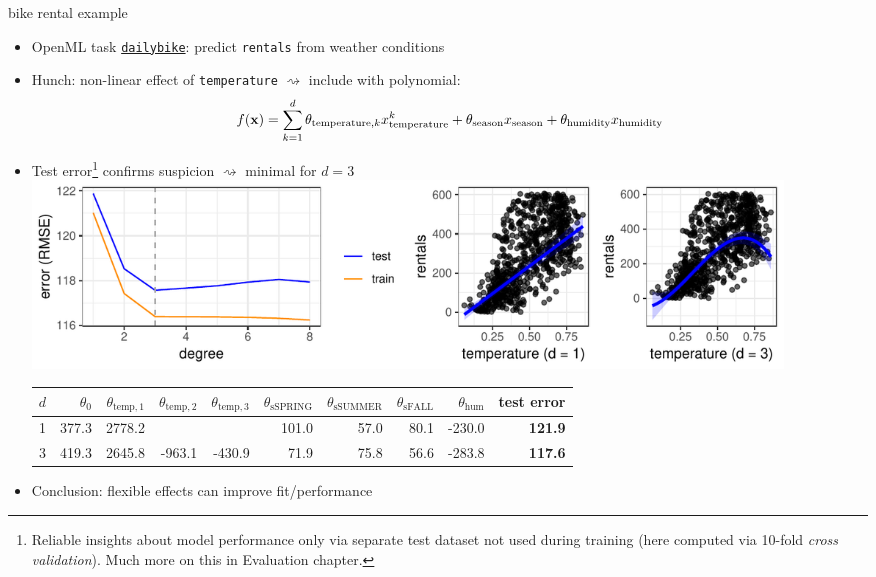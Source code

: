 \documentclass[11pt,compress,t,notes=noshow, xcolor=table]{beamer}
\begin{document}
\begin{frame}{bike rental example}

\begin{itemize}
    \footnotesize
    \item OpenML task \href{https://www.openml.org/search?type=data&sort=runs&id=45103&status=active}{
    \texttt{dailybike}}: predict \texttt{rentals} from weather conditions
    \item Hunch: non-linear effect of \texttt{temperature} $\rightsquigarrow$
    include with polynomial:
    \[
        f(\mathbf{x}) = \sum_{k=1}^d \theta_{\text{temperature}, k}
        x_{\text{temperature}}^k + \theta_{\text{season}} x_{\text{season}} +
        \theta_{\text{humidity}} x_{\text{humidity}}
    \]
    \item Test error\footnote[frame]{
    \scriptsize
    Reliable insights about model performance only via separate test
    dataset not used during training (here computed via 10-fold
    \textit{cross validation}). Much more on this in Evaluation chapter.
    } confirms suspicion $\rightsquigarrow$ minimal
    for $d = 3$
    \vfill
    \includegraphics[width=0.9\textwidth]{figure/reg_poly_bike}
    \tiny
    \begin{tabular}{rrrrrrrrrr}
        $d$ & $\theta_0$ & $\theta_{\text{temp}, 1}$ & $\theta_{\text{temp}, 2}$
        & $\theta_{\text{temp}, 3}$ & $\theta_{\text{sSPRING}}$ &
        $\theta_{\text{sSUMMER}}$ & $\theta_{\text{sFALL}}$ &
        $\theta_{\text{hum}}$ & \textbf{test error} \\ \hline
        1 & 377.3 & 2778.2 & & & 101.0 & 57.0 & 80.1 & -230.0 & \textbf{121.9}\\
        \rowcolor{black!10}
        3 & 419.3 & 2645.8 & -963.1 & -430.9 & 71.9 & 75.8 & 56.6 & -283.8 &
        \textbf{117.6}
    \end{tabular}
    \vfill
    \footnotesize
    \item Conclusion: flexible effects can improve fit/performance
\end{itemize}

\end{frame}


\endlecture
\end{document}
